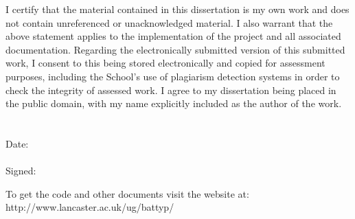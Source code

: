 %
%
%
%
%
%

\vspace*{\fill}

I certify that the material contained in this dissertation is my own work and does not contain unreferenced or unacknowledged material. I also warrant that the above statement applies to the implementation of the project and all associated documentation. Regarding the electronically submitted version of this submitted work, I consent to this being stored electronically and copied for assessment purposes, including the School’s use of plagiarism detection systems in order to check the integrity of assessed work.
I agree to my dissertation being placed in the public domain, with my name explicitly included as the author of the work.
\\\\\\
Date:
\\\\
Signed: 

\vspace*{\fill}

\begin{center}
To get the code and other documents visit the website at: 
http://www.lancaster.ac.uk/ug/battyp/
\end{center}